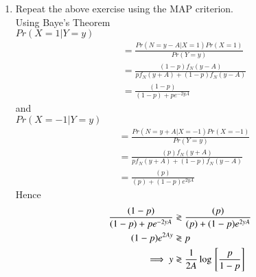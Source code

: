 \documentclass[journal,12pt,twocolumn]{IEEEtran}
\renewcommand\thesection{\arabic{section}}
\begin{document}
\begin{enumerate}[label=\thesection.\arabic*
,ref=\thesection.\theenumi]
\solution 
\begin{align}
    p f_N(A+\delta) &= (1-p) f_N(A-\delta)\\
    p e^{-\frac{(A+\delta)^2}{2}} &= (1-p) e^{-\frac{(A-\delta)^2}{2}}\\
    \implies \delta &= \frac{1}{2A}\log\sbrak{\frac{p}{1-p}}
\end{align}
\item Repeat the above exercise using the MAP criterion.\\
\solution Using Baye's Theorem \\
$Pr(X=1|Y=y)$
\begin{align}
    &=\frac{Pr(N= y-A|X=1)Pr(X=1)}{Pr(Y=y)}\\
    &=\frac{(1-p)f_N(y-A)}{pf_N(y+A)+(1-p)f_N(y-A)}\\
    &=\frac{(1-p)}{(1-p)+pe^{-2yA}}
\end{align}
and \\
$Pr(X=-1|Y=y)$
\begin{align}
    &=\frac{Pr(N= y+A|X=-1)Pr(X=-1)}{Pr(Y=y)}\\
    &=\frac{(p)f_N(y+A)}{pf_N(y+A)+(1-p)f_N(y-A)}\\
    &=\frac{(p)}{(p)+(1-p)e^{2yA}}
\end{align}
Hence 
\begin{align}
    \frac{(1-p)}{(1-p)+pe^{-2yA}} &\gtrless \frac{(p)}{(p)+(1-p)e^{2yA}} \\
    (1-p) e^{2Ay} &\gtrless p \\
    \implies y &\gtrless \frac{1}{2A}\log{}\left[\frac{p}{1-p}\right]
\end{align}


		\end{enumerate}
\end{document}
